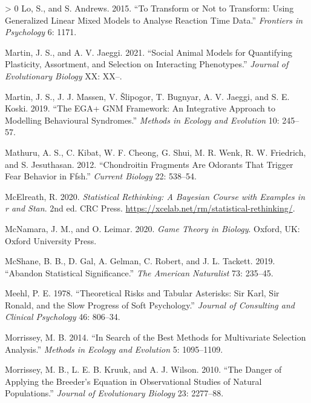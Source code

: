 \documentclass{article}
\newlength{\cslhangindent}
\newenvironment{CSLReferences}[3] %
 {%
  \setlength{\parindent}{0pt}
  \ifodd #1 \everypar{\setlength{\hangindent}{\cslhangindent}}\ignorespaces\fi
  \ifnum #2 > 0
  \setlength{\parskip}{#2\baselineskip}
  \fi
 }%
 {}
\begin{document}
\begin{CSLReferences}{1}{0}
\leavevmode\hypertarget{ref-Lo2015}{}%
Lo, S., and S. Andrews. 2015. {``To Transform or Not to Transform: Using
Generalized Linear Mixed Models to Analyse Reaction Time Data.''}
\emph{Frontiers in Psychology} 6: 1171.

\leavevmode\hypertarget{ref-Martin2021}{}%
Martin, J. S., and A. V. Jaeggi. 2021. {``Social Animal Models for
Quantifying Plasticity, Assortment, and Selection on Interacting
Phenotypes.''} \emph{Journal of Evolutionary Biology} XX: XX--.

\leavevmode\hypertarget{ref-Martin2019}{}%
Martin, J. S., J. J. Massen, V. Šlipogor, T. Bugnyar, A. V. Jaeggi, and
S. E. Koski. 2019. {``The EGA+ GNM Framework: An Integrative Approach to
Modelling Behavioural Syndromes.''} \emph{Methods in Ecology and
Evolution} 10: 245--57.

\leavevmode\hypertarget{ref-Mathuru2012}{}%
Mathuru, A. S., C. Kibat, W. F. Cheong, G. Shui, M. R. Wenk, R. W.
Friedrich, and S. Jesuthasan. 2012. {``Chondroitin Fragments Are
Odorants That Trigger Fear Behavior in Ffsh.''} \emph{Current Biology}
22: 538--54.

\leavevmode\hypertarget{ref-Rethinking}{}%
McElreath, R. 2020. \emph{Statistical Rethinking: A Bayesian Course with
Examples in r and Stan}. 2nd ed. CRC Press.
\url{https://xcelab.net/rm/statistical-rethinking/}.

\leavevmode\hypertarget{ref-McNamara2020}{}%
McNamara, J. M., and O. Leimar. 2020. \emph{Game Theory in Biology}.
Oxford, UK: Oxford University Press.

\leavevmode\hypertarget{ref-McShane2019}{}%
McShane, B. B., D. Gal, A. Gelman, C. Robert, and J. L. Tackett. 2019.
{``Abandon Statistical Significance.''} \emph{The American Naturalist}
73: 235--45.

\leavevmode\hypertarget{ref-Meehl1978}{}%
Meehl, P. E. 1978. {``Theoretical Risks and Tabular Asterisks: Sir Karl,
Sir Ronald, and the Slow Progress of Soft Psychology.''} \emph{Journal
of Consulting and Clinical Psychology} 46: 806--34.

\leavevmode\hypertarget{ref-Morrissey2014}{}%
Morrissey, M. B. 2014. {``In Search of the Best Methods for Multivariate
Selection Analysis.''} \emph{Methods in Ecology and Evolution} 5:
1095--1109.

\leavevmode\hypertarget{ref-Morrissey2010}{}%
Morrissey, M. B., L. E. B. Kruuk, and A. J. Wilson. 2010. {``The Danger
of Applying the Breeder's Equation in Observational Studies of Natural
Populations.''} \emph{Journal of Evolutionary Biology} 23: 2277--88.


\end{CSLReferences}
\end{document}
